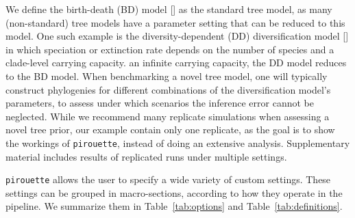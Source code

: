 We define the birth-death (BD) model [\cite{nee1994reconstructed}] as
the standard tree model, as many (non-standard) tree models 
have a parameter setting that can be reduced to this model. 
One such example is the diversity-dependent (DD) diversification 
model [\cite{DDD, etienne2012diversity}] in which speciation 
or extinction rate depends 
on the number of species and a clade-level carrying capacity.
an infinite carrying capacity, the DD model reduces to the BD model.
When benchmarking a novel tree model, 
one will typically construct phylogenies 
for different combinations of the diversification model's parameters, 
to assess under which scenarios the inference error cannot be neglected. 
While we recommend many replicate simulations 
when assessing a novel tree prior, 
our example contain only one replicate,
as the goal is to show the workings of \verb;pirouette;,
instead of doing an extensive analysis.
Supplementary material includes results of replicated runs under multiple settings.

\verb;pirouette; allows the user to specify a wide variety of custom settings. 
These settings can be grouped in macro-sections, 
according to how they operate in the pipeline. 
We summarize them in Table~\ref{tab:options} and Table~\ref{tab:definitions}.

